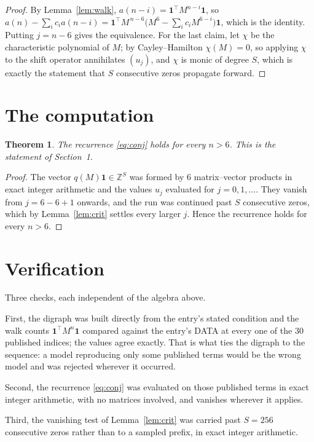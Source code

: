 \documentclass[11pt,a4paper]{article}
\theoremstyle{plain}
\newtheorem{theorem}{Theorem}
\theoremstyle{definition}
\begin{document}
\begin{proof}
By Lemma~\ref{lem:walk}, $a(n-i)=\mathbf{1}^{\!\top}M^{n-i}\mathbf{1}$, so
$a(n)-\sum_i c_i a(n-i)
=\mathbf{1}^{\!\top}M^{\,n-6}\bigl(M^{6}-\sum_i c_i M^{6-i}\bigr)
\mathbf{1}$, which is the identity. Putting $j=n-6$ gives the equivalence. For the
last claim, let $\chi$ be the characteristic polynomial of $M$; by Cayley--Hamilton
$\chi(M)=0$, so applying $\chi$ to the shift operator annihilates $(u_j)$, and $\chi$ is
monic of degree $S$, which is exactly the statement that $S$ consecutive zeros propagate
forward.
\end{proof}

\section{The computation}

\begin{theorem}
The recurrence \eqref{eq:conj} holds for every $n>6$. This is the statement of
Section~1.
\end{theorem}

\begin{proof}
The vector $q(M)\mathbf{1}\in\mathbb{Z}^{S}$ was formed by $6$ matrix--vector
products in exact integer arithmetic and the values $u_j$ evaluated for
$j=0,1,\dots$. They vanish from $j=6-6+1$ onwards, and the run was continued past
$S$ consecutive zeros, which by Lemma~\ref{lem:crit} settles every larger $j$. Hence the
recurrence holds for every $n>6$.
\end{proof}

\section{Verification}

Three checks, each independent of the algebra above.

First, the digraph was built directly from the entry's stated condition and the walk counts
$\mathbf{1}^{\!\top}M^{n}\mathbf{1}$ compared against the entry's DATA at every one of
the $30$ published indices; the values agree exactly. That is what ties the digraph to
the sequence: a model reproducing only some published terms would be the wrong model and
was rejected wherever it occurred.

Second, the recurrence \eqref{eq:conj} was evaluated on those published terms in exact
integer arithmetic, with no matrices involved, and vanishes wherever it applies.

Third, the vanishing test of Lemma~\ref{lem:crit} was carried past $S=256$ consecutive
zeros rather than to a sampled prefix, in exact integer arithmetic.
\end{document}
